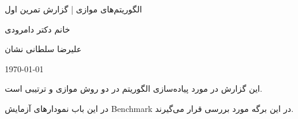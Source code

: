 \documentclass[20pt, a4paper]{article}
\begin{document}
\centerline{الگوریتم‌های موازی | گزارش تمرین اول}
\centerline {خانم دکتر دامرودی}
\centerline{علیرضا سلطانی نشان}
\centerline{\today}

این گزارش در مورد پیاده‌سازی الگوریتم  در دو روش موازی و
ترتیبی است.

در این باب نمودار‌های آزمایش Benchmark در این برگه مورد بررسی قرار می‌گیرند.
\end{document}
